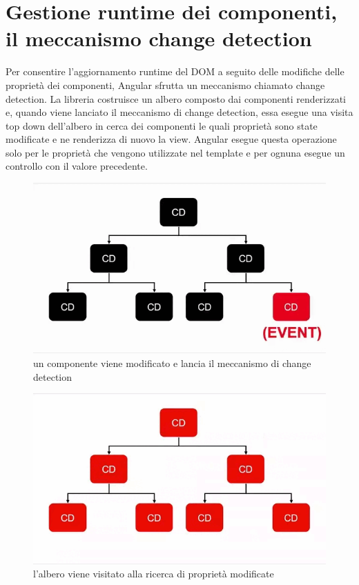 \section{Gestione runtime dei componenti, il meccanismo change detection}
Per consentire l'aggiornamento runtime  del DOM a seguito delle modifiche delle proprietà dei componenti, Angular sfrutta un meccanismo chiamato change detection.
\newline
 La libreria costruisce un albero composto dai componenti renderizzati e, quando viene lanciato il meccanismo di change detection, essa esegue una visita top down dell'albero in cerca dei componenti le quali proprietà sono state modificate e ne renderizza di nuovo la view. Angular esegue questa operazione solo per le proprietà che vengono utilizzate nel template e per ognuna esegue un controllo con il valore precedente.
\newline
\begin{figure}[H]
\centering
   \includegraphics[scale=0.5]{resources/cd-1.png}
\caption{un componente viene modificato e lancia il meccanismo di change detection}
\end{figure}
\begin{figure}[H]
\centering
   \includegraphics[scale=0.5]{resources/cd-2.png}
\caption{l'albero viene visitato alla ricerca di proprietà modificate}
\end{figure}





